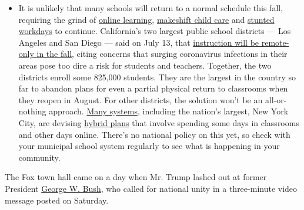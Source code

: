 \begin{itemize}
  \begin{itemize}
  \tightlist
  \item
    It is unlikely that many schools will return to a normal schedule
    this fall, requiring the grind of
    \href{https://www.nytimes.com/2020/06/05/us/coronavirus-education-lost-learning.html?action=click\&pgtype=Article\&state=default\&region=MAIN_CONTENT_3\&context=storylines_faq}{online
    learning},
    \href{https://www.nytimes.com/2020/05/29/us/coronavirus-child-care-centers.html?action=click\&pgtype=Article\&state=default\&region=MAIN_CONTENT_3\&context=storylines_faq}{makeshift
    child care} and
    \href{https://www.nytimes.com/2020/06/03/business/economy/coronavirus-working-women.html?action=click\&pgtype=Article\&state=default\&region=MAIN_CONTENT_3\&context=storylines_faq}{stunted
    workdays} to continue. California's two largest public school
    districts --- Los Angeles and San Diego --- said on July 13, that
    \href{https://www.nytimes.com/2020/07/13/us/lausd-san-diego-school-reopening.html?action=click\&pgtype=Article\&state=default\&region=MAIN_CONTENT_3\&context=storylines_faq}{instruction
    will be remote-only in the fall}, citing concerns that surging
    coronavirus infections in their areas pose too dire a risk for
    students and teachers. Together, the two districts enroll some
    825,000 students. They are the largest in the country so far to
    abandon plans for even a partial physical return to classrooms when
    they reopen in August. For other districts, the solution won't be an
    all-or-nothing approach.
    \href{https://bioethics.jhu.edu/research-and-outreach/projects/eschool-initiative/school-policy-tracker/}{Many
    systems}, including the nation's largest, New York City, are
    devising
    \href{https://www.nytimes.com/2020/06/26/us/coronavirus-schools-reopen-fall.html?action=click\&pgtype=Article\&state=default\&region=MAIN_CONTENT_3\&context=storylines_faq}{hybrid
    plans} that involve spending some days in classrooms and other days
    online. There's no national policy on this yet, so check with your
    municipal school system regularly to see what is happening in your
    community.
  \end{itemize}
\end{itemize}

The Fox town hall came on a day when Mr. Trump lashed out at former
President
\href{https://www.nytimes.com/topic/person/george-w-bush}{George W.
Bush}, who called for national unity in a three-minute video message
posted on Saturday.


